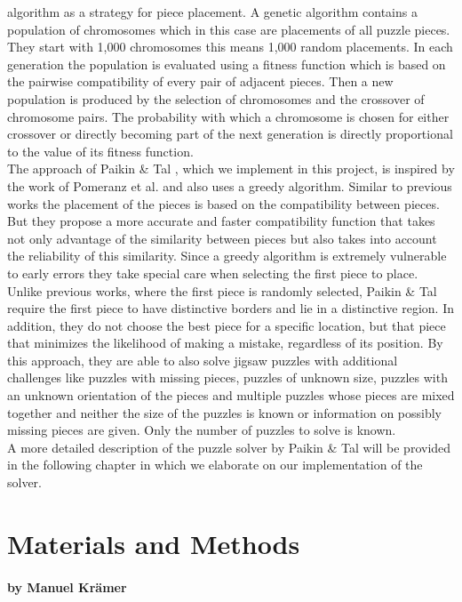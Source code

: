 \documentclass[11pt]{report}
\begin{document}
algorithm as a strategy for piece placement. A genetic algorithm contains a
population of chromosomes which in this case are placements of all puzzle
pieces. They start with 1,000 chromosomes this means 1,000 random placements. In
each generation the population is evaluated using a fitness function which is
based on the pairwise compatibility of every pair of adjacent pieces. Then a new
population is produced by the selection of chromosomes and the crossover of
chromosome pairs. The probability with which a chromosome is chosen for either
crossover or directly becoming part of the next generation is directly
proportional to the value of its fitness function. \\
The approach of Paikin \& Tal \cite{Paikin2015}, which we implement in this
project, is inspired by the work of Pomeranz et al. \cite{Pomeranz2011} and also
uses a greedy algorithm. Similar to previous works the placement of the pieces
is based on the compatibility between pieces. But they propose a more accurate
and faster compatibility function that takes not only advantage of the
similarity between pieces but also takes into account the reliability of this
similarity. Since a greedy algorithm is extremely vulnerable to early errors
they take special care when selecting the first piece to place. Unlike previous
works, where the first piece is randomly selected, Paikin \& Tal require the first piece
to have distinctive borders and lie in a distinctive region. In addition, they
do not choose the best piece for a specific location, but that piece that
minimizes the likelihood of making a mistake, regardless of its position. By
this approach, they are able to also solve jigsaw puzzles with additional
challenges like puzzles with missing pieces, puzzles of unknown size, puzzles
with an unknown orientation of the pieces and multiple puzzles whose pieces are
mixed together and neither the size of the puzzles is known or information on
possibly missing pieces are given. Only the number of puzzles to solve is known. \\
A more detailed description of the puzzle solver by Paikin \& Tal will be
provided in the following chapter in which we elaborate on our implementation of
the solver.

\chapter{Materials and Methods}
\subsubsection*{by Manuel Krämer}
\end{document}
